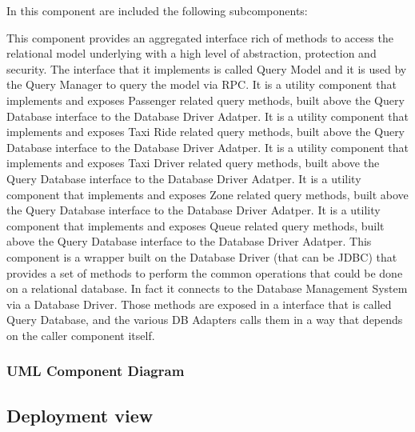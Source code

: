 \begin{itemize}
	In this component are included the following subcomponents:
	\begin{itemize}
		This component provides an aggregated interface rich of methods to access the relational model underlying with a high level of abstraction, protection and security.
		The interface that it implements is called Query Model and it is used by the Query Manager to query the model via RPC.
		It is a utility component that implements and exposes Passenger related query methods, built above the Query Database interface to the Database Driver Adatper.
		It is a utility component that implements and exposes Taxi Ride related query methods, built above the Query Database interface to the Database Driver Adatper.
		It is a utility component that implements and exposes Taxi Driver related query methods, built above the Query Database interface to the Database Driver Adatper.
		It is a utility component that implements and exposes Zone related query methods, built above the Query Database interface to the Database Driver Adatper.
		It is a utility component that implements and exposes Queue related query methods, built above the Query Database interface to the Database Driver Adatper.
		This component is a wrapper built on the Database Driver (that can be JDBC) that provides a set of methods to perform the common operations that could be done on a relational database.
		In fact it connects to the Database Management System via a Database Driver.
		Those methods are exposed in a interface that is called Query Database, and the various DB Adapters calls them in a way that depends on the caller component itself.
	\end{itemize}
\end{itemize} 
\subsubsection{UML Component Diagram}

\subsection{Deployment view}

